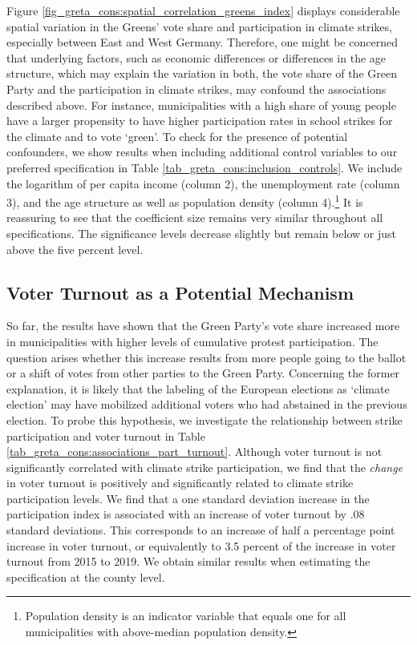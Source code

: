 Figure \ref{fig_greta_cons:spatial_correlation_greens_index} displays considerable spatial variation in the Greens' vote share and participation in climate strikes, especially between East and West Germany. Therefore, one might be concerned that underlying factors, such as economic differences or differences in the age structure, which may explain the variation in both, the vote share of the Green Party and the participation in climate strikes, may confound the associations described above. For instance, municipalities with a high share of young people have a larger propensity to have higher participation rates in school strikes for the climate and to vote `green'. To check for the presence of potential confounders, we show results when including additional control variables to our preferred specification in Table \ref{tab_greta_cons:inclusion_controls}. We include the logarithm of per capita income (column 2), the unemployment rate (column 3), and the age structure as well as population density (column 4).\footnote{Population density is an indicator variable that equals one for all municipalities with above-median population density.} It is reassuring to see that the coefficient size remains very similar throughout all specifications. The significance levels decrease slightly but remain below or just above the five percent level. 




\subsection{Voter Turnout as a Potential Mechanism}



So far, the results have shown that the Green Party's vote share increased more in municipalities with higher levels of cumulative protest participation. The question arises whether this increase results from more people going to the ballot or a shift of votes from other parties to the Green Party. Concerning the former explanation, it is likely that the labeling of the European elections as `climate election' may have mobilized additional voters who had abstained in the previous election. To probe this hypothesis, we investigate the relationship between strike participation and voter turnout in Table \ref{tab_greta_cons:associations_part_turnout}. Although voter turnout is not significantly correlated with climate strike participation, we find that the \emph{change} in voter turnout is positively and significantly related to climate strike participation levels. We find that a one standard deviation increase in the participation index is associated with an increase of voter turnout by .08 standard deviations. This corresponds to an increase of half a percentage point increase in voter turnout, or equivalently to 3.5 percent of the increase in voter turnout from 2015 to 2019. We obtain similar results when estimating the specification at the county level.


